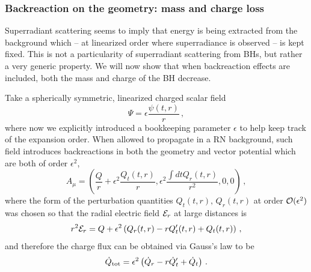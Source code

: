 \documentclass[11pt]{article}
\newcommand{\be}{\begin{equation}}
\newcommand{\ee}{\end{equation}}
\numberwithin{equation}{section} %
\begin{document}
\subsubsection{Backreaction on the geometry: mass and charge loss\label{backreaction_charged}}
Superradiant scattering seems to imply that energy is being extracted from the background which -- at linearized
order where superradiance is observed -- is kept fixed. This is not a particularity of superradiant scattering from BHs,
but rather a very generic property. We will now show
that when backreaction effects are included, both the mass and charge of the BH decrease. 

Take a spherically symmetric, linearized charged scalar field
%
\be
\Psi=\epsilon \frac{\psi(t,r)}{r}\,, 
\ee
%
where now we explicitly introduced a bookkeeping parameter $\epsilon$ to help keep track of the expansion order.
When allowed to propagate in a RN background, such field  introduces backreactions in both the geometry and vector potential
which are both of order $\epsilon^2$,
%
\be
A_{\mu}=\left(\frac{Q}{r}+\epsilon^2\frac{Q_t(t,r)}{r},\epsilon^2\frac{\int{dt Q_r(t,r)}}{r^2},0,0\right)\,,
\ee
%
where the form of the perturbation quantities $Q_t(t,r),\,Q_r(t,r)$ at order ${\cal O}(\epsilon^2)$ was chosen so that the radial electric field ${\cal E}_r$ at large distances is 
%
\be
r^2{\cal E}_r=Q+\epsilon^2\left(Q_r(t,r)-rQ_t'(t,r)+Q_t(t,r)\right)\,,
\ee
%
and therefore the charge flux can be obtained via Gauss's law to be
%
\be
\dot{Q}_{\rm tot}=\epsilon^2\left(\dot{Q}_r-r\dot{Q}_t'+\dot{Q}_t\right)\,.\label{Qtot_gauss}
\ee
%
\end{document}
